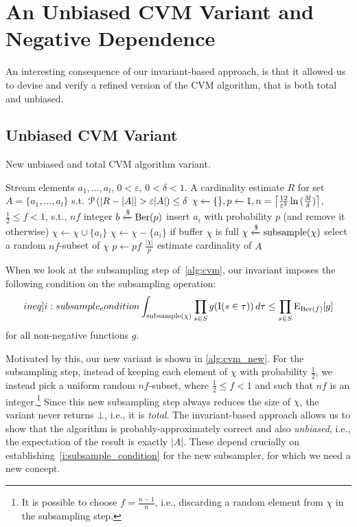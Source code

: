 \section{An Unbiased CVM Variant and Negative Dependence\label{sec:negdep}}

An interesting consequence of our invariant-based approach, is that it allowed us to devise and verify a refined version of the CVM algorithm, that is both total and unbiased.

\subsection{Unbiased CVM Variant}

\begin{algorithm}
	\caption{New unbiased and total CVM algorithm variant.}\label{alg:cvm_new}
	\begin{algorithmic}[1]
  \Require Stream elements $a_1,\dots,a_l$, $0 < \varepsilon$, $0 < \delta < 1$.
  \Ensure A cardinality estimate $R$ for set $A = \{ a_1,\dots,a_l \}$ s.t. $\prob \left( |R - |A| | > \varepsilon |A| \right) \leq \delta$
  \State $\chi \gets \{\}, p \gets 1, n = \ceil*{\frac{12}{\varepsilon^2} \ln{(\frac{3l}{\delta})} }$, $\frac{1}{2} \leq f < 1$, s.t., $nf$ integer
    \State $b \getsr \Ber(p)$ \Comment insert $a_i$ with probability $p$ (and remove it otherwise)
      \State $\chi \gets \chi \cup \{a_i\}$
    \Else
      \State $\chi \gets \chi - \{a_i\}$
    \EndIf
     \Comment if buffer $\chi$ is full
      \State $\chi \getsr \mathrm{subsample}(\chi)$ \Comment select a random $nf$-subset of $\chi$
      \State $p \gets pf$
    \EndIf
  \EndFor
  \State \Return $\frac{|\chi|}{p}$ \Comment estimate cardinality of $A$
  \end{algorithmic}
\end{algorithm}%


When we look at the subsampling step of~\cref{alg:cvm}, our invariant imposes the following condition on the subsampling operation:
\begin{equation}\label[ineq]{i:subsample_condition}
  \int_{\mathrm{subsample}(\chi)} \prod_{s \in S} g(\indicat(s \in \tau)) \, d \tau \leq \prod_{s \in S} \expect_{\Ber(f)} [g]
\end{equation}
for all non-negative functions $g$.

Motivated by this, our new variant is shown in \cref{alg:cvm_new}.
For the subsampling step, instead of keeping each element of $\chi$ with probability $\frac{1}{2}$, we instead pick a uniform random $nf$-subset, where $\frac{1}{2} \leq f < 1$ and such that $nf$ is an integer.\footnote{It is possible to choose $f = \frac{n-1}{n}$, i.e., discarding a random element from $\chi$ in the subsampling step.}
Since this new subsampling step always reduces the size of $\chi$, the variant never returns $\bot$, i.e., it is \emph{total}.
The invariant-based approach allows us to show that the algorithm is probably-approximately correct and also \emph{unbiased}, i.e., the expectation of the result is exactly $|A|$.
These depend crucially on establishing~\cref{i:subsample_condition} for the new subsampler, for which we need a new concept.

